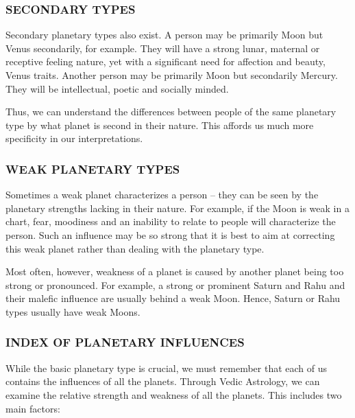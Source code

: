  

\subsubsection{SECONDARY TYPES}

 

Secondary planetary types also exist. A person may be primarily Moon but Venus secondarily, for example. They will have a strong lunar, maternal or receptive feeling nature, yet with a significant need for affection and beauty, Venus traits. Another person may be primarily Moon but secondarily Mercury. They will be intellectual, poetic and socially minded.

 

Thus, we can understand the differences between people of the same planetary type by what planet is second in their nature. This affords us much more specificity in our interpretations.

 

\subsubsection{WEAK PLANETARY TYPES}

 

Sometimes a weak planet characterizes a person – they can be seen by the planetary strengths lacking in their nature. For example, if the Moon is weak in a chart, fear, moodiness and an inability to relate to people will characterize the person. Such an influence may be so strong that it is best to aim at correcting this weak planet rather than dealing with the planetary type.

 

Most often, however, weakness of a planet is caused by another planet being too strong or pronounced. For example, a strong or prominent Saturn and Rahu and their malefic influence are usually behind a weak Moon. Hence, Saturn or Rahu types usually have weak Moons.

 

\subsubsection{INDEX OF PLANETARY INFLUENCES }

 

While the basic planetary type is crucial, we must remember that each of us contains the influences of all the planets. Through Vedic Astrology, we can examine the relative strength and weakness of all the planets. This includes two main factors:

